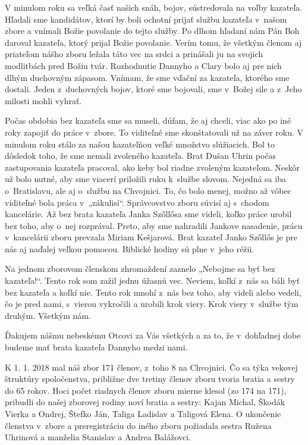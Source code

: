 V minulom roku sa veľká časť našich snáh, bojov, sústreďovala na voľby kazateľa.  Hľadali sme kandidátov, ktorí by boli ochotní prijať službu kazateľa v~našom zbore a vnímali Božie povolanie do tejto služby. Po dlhom  hľadaní nám Pán Boh daroval kazateľa, ktorý prijal Božie povolanie. Verím tomu, že všetkým členom aj priateľom nášho zboru ležala táto vec na srdci a prinášali ju na svojich modlitbách pred Božiu tvár. Rozhodnutie Dannyho a Clary bolo aj pre nich dlhým duchovným zápasom. Vnímam, že sme vďační za kazateľa, ktorého sme dostali. Jeden z~duchovných bojov, ktoré sme bojovali, sme v~Božej sile a z~Jeho milosti mohli vyhrať.

Počas obdobia bez kazateľa sme sa museli, dúfam, že aj chceli, viac ako po iné roky zapojiť do práce v~zbore. To viditeľné sme skonštatovali už na záver roku. V minulom roku stálo za našou kazateľňou veľké množstvo slúžiacich. Bol to dôsledok toho, že sme nemali zvoleného kazateľa. Brat Dušan Uhrin počas zastupovania kazateľa pracoval, ako keby bol riadne zvoleným kazateľom. Neskôr už bolo nutné, aby sme viacerí priložili ruku k~službe slovom. Nejedná sa iba o~Bratislavu, ale aj o~službu na Chvojnici. To, čo bolo menej, možno až vôbec viditeľné bola práca v~„zákulisí“.  Správcovstvo zboru súvisí aj s~chodom kancelárie. Až bez brata kazateľa Janka Szőllősa sme videli, koľko práce urobil bez toho, aby o~nej rozprával. Preto, aby sme nahradili Jankove nasadenie, prácu v~kancelárii zboru prevzala Miriam Kešjarová. Brat kazateľ Janko Szőllős je pre nás aj naďalej veľkou pomocou. Biblické hodiny sú plne v~jeho réžii.

Na jednom zborovom členskom zhromaždení zaznelo „Nebojme sa byť bez kazateľa!“.  Tento rok som zažil jednu úžasnú vec. Neviem, koľkí z~nás sa báli byť bez kazateľa a koľkí nie. Tento rok mnohí z~nás bez toho, aby videli alebo vedeli, čo je pred nami, s~vierou vykročili a urobili krok viery. Krok viery v~službe tým druhým. Všetkým nám.

Ďakujem nášmu nebeskému Otcovi za Vás všetkých a za to, že v~dohľadnej dobe budeme mať brata kazateľa Dannyho medzi nami.


K 1. 1. 2018 mal náš zbor 171 členov, z~toho 8 na Chvojnici. Čo sa týka vekovej štruktúry spoločenstva, približne dve tretiny členov zboru tvoria bratia a sestry do 65 rokov. Hoci počet riadnych členov zboru mierne klesol (zo 174 na 171), pribudli do našej zborovej rodiny noví bratia a sestry:  Kajan Michal, Škodák Vierka a Ondrej, Štefko Ján, Taliga Ladislav a Taligová Elena. O ukončenie členstva v~zbore a preregistráciu do iného zboru požiadala sestra Ružena Uhrinová a manželia Stanislav a Andrea Balážovci.

